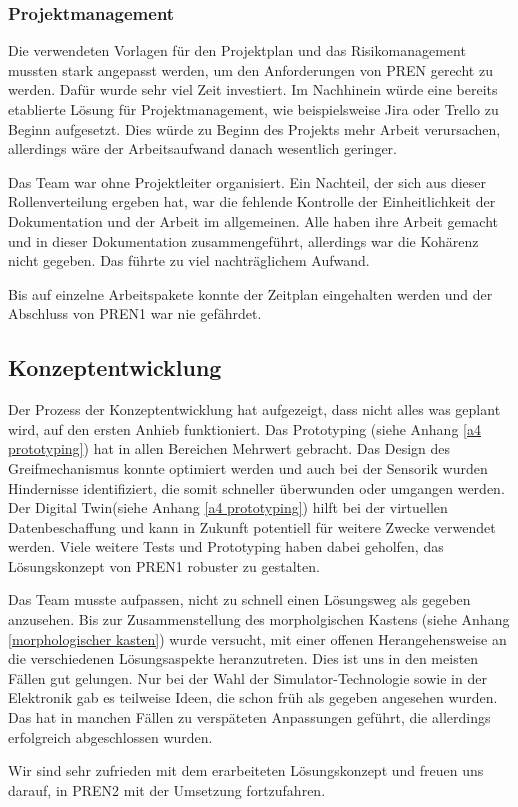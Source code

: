 \documentclass[../main.tex]{subfiles}
\begin{document}
\subsubsection{Projektmanagement}

Die verwendeten Vorlagen für den Projektplan und das Risikomanagement mussten stark angepasst werden, um den Anforderungen von PREN gerecht zu werden. Dafür wurde sehr viel Zeit investiert. Im Nachhinein würde eine bereits etablierte Lösung für Projektmanagement, wie beispielsweise Jira oder Trello zu Beginn aufgesetzt. Dies würde zu Beginn des Projekts mehr Arbeit verursachen, allerdings wäre der Arbeitsaufwand danach wesentlich geringer.

Das Team war ohne Projektleiter organisiert. Ein Nachteil, der sich aus dieser Rollenverteilung ergeben hat, war die fehlende Kontrolle der Einheitlichkeit der Dokumentation und der Arbeit im allgemeinen. Alle haben ihre Arbeit gemacht und in dieser Dokumentation zusammengeführt, allerdings war die Kohärenz nicht gegeben. Das führte zu viel nachträglichem Aufwand.

Bis auf einzelne Arbeitspakete konnte der Zeitplan eingehalten werden und der Abschluss von PREN1 war nie gefährdet.

\subsection{Konzeptentwicklung}

Der Prozess der Konzeptentwicklung hat aufgezeigt, dass nicht alles was geplant wird, auf den ersten Anhieb funktioniert. Das Prototyping (siehe Anhang \ref{a4 prototyping}) hat in allen Bereichen Mehrwert gebracht. Das Design des Greifmechanismus konnte optimiert werden und auch bei der Sensorik wurden Hindernisse identifiziert, die somit schneller überwunden oder umgangen werden. Der Digital Twin(siehe Anhang \ref{a4 prototyping}) hilft bei der virtuellen Datenbeschaffung und kann in Zukunft potentiell für weitere Zwecke verwendet werden. Viele weitere Tests und Prototyping haben dabei geholfen, das Lösungskonzept von PREN1 robuster zu gestalten.

Das Team musste aufpassen, nicht zu schnell einen Lösungsweg als gegeben anzusehen. Bis zur Zusammenstellung des morpholgischen Kastens (siehe Anhang \ref{morphologischer kasten}) wurde versucht, mit einer offenen Herangehensweise an die verschiedenen Lösungsaspekte heranzutreten. Dies ist uns in den meisten Fällen gut gelungen. Nur bei der Wahl der Simulator-Technologie sowie in der Elektronik gab es teilweise Ideen, die schon früh als gegeben angesehen wurden. Das hat in manchen Fällen zu verspäteten Anpassungen geführt, die allerdings erfolgreich abgeschlossen wurden.

Wir sind sehr zufrieden mit dem erarbeiteten Lösungskonzept und freuen uns darauf, in PREN2 mit der Umsetzung fortzufahren.
\end{document}
